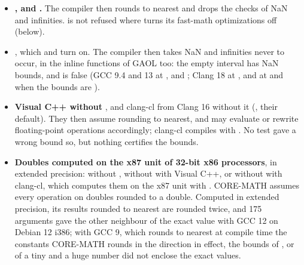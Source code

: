 \documentclass[12pt,a4paper,twoside,openright]{book}
\begin{document}
\begin{itemize}
  it.
\item[$\bullet$] \textbf{,  and
  .} The compiler then rounds to nearest and drops the checks
  of NaN and infinities.  is not refused where
   turns its fast-math optimizations off (below).
\item[$\bullet$] \textbf{}, which
   and  turn on. The compiler then takes
  NaN and infinities never to occur, in the inline functions of GAOL too: the
  empty interval has NaN bounds, and  is
  false (GCC 9.4 and 13 at ,  and ;
  Clang 18 at , and at  and  when the
  bounds are ).
\item[$\bullet$] \textbf{Visual C++ without }, and clang-cl
  from Clang 16 without it (, their default). They then
  assume rounding to nearest, and may evaluate or rewrite floating-point
  operations accordingly; clang-cl compiles with . No test gave a wrong bound so, but nothing certifies the
  bounds.\newinvfive
\item[$\bullet$] \textbf{Doubles computed on the x87 unit of 32-bit x86
  processors}, in extended precision: without ,
  without  with Visual C++, or without 
  with clang-cl, which computes them on the x87 unit with .
  CORE-MATH assumes every operation on doubles rounded to a double. Computed
  in extended precision, its results rounded to nearest are rounded twice, and
  175 arguments gave the other neighbour of the exact value with GCC 12 on
  Debian 12 i386; with GCC 9, which rounds to nearest at compile time the
  constants CORE-MATH rounds in the direction in effect, the bounds of
  ,  or  of a tiny and a
  huge number did not enclose the exact values.
\end{itemize}
\end{document}
